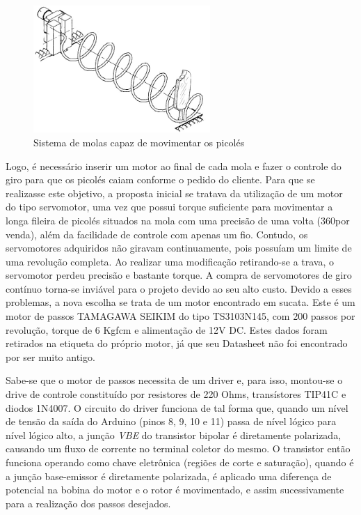 \begin{figure}[H]
	\centering
    \includegraphics[width=0.6\textwidth]{figuras/sistema_molas}
    \caption{Sistema de molas capaz de movimentar os picolés}
    \label{fig:sistema_molas}
\end{figure}

Logo, é necessário inserir um motor ao final de cada mola e fazer o controle do giro para que os picolés caiam conforme o pedido do cliente. Para que se realizasse este objetivo, a proposta inicial se tratava da utilização de um motor do tipo servomotor, uma vez que possui torque suficiente para movimentar a longa fileira de picolés situados na mola com uma precisão de uma volta (360\degree por venda), além da facilidade de controle com apenas um fio. Contudo, os servomotores adquiridos não giravam continuamente, pois possuíam um limite de uma revolução completa. Ao realizar uma modificação retirando-se a trava, o servomotor perdeu precisão e bastante torque. A compra de servomotores de giro contínuo torna-se inviável para o projeto devido ao seu alto custo. Devido a esses problemas, a nova escolha se trata de um motor encontrado em sucata. Este é um motor de passos TAMAGAWA SEIKIM do tipo TS3103N145, com 200 passos por revolução, torque de 6 Kgfcm e alimentação de 12V DC. Estes dados foram retirados na etiqueta do próprio motor, já que seu Datasheet não foi encontrado por ser muito antigo.

Sabe-se que o motor de passos necessita de um driver e, para isso, montou-se o drive de controle constituído por resistores de 220 Ohms, transístores TIP41C e diodos 1N4007. O circuito do driver funciona de tal forma que, quando um nível de tensão da saída do Arduino (pinos 8, 9, 10 e 11) passa de nível lógico para nível lógico alto, a junção \textit{VBE} do transistor bipolar é diretamente polarizada, causando um fluxo de corrente no terminal coletor do mesmo. O transistor então funciona operando como chave eletrônica (regiões de corte e saturação), quando é a junção base-emissor é diretamente polarizada, é aplicado uma diferença de potencial na bobina do motor e o rotor é movimentado, e assim sucessivamente para a realização dos passos desejados.

